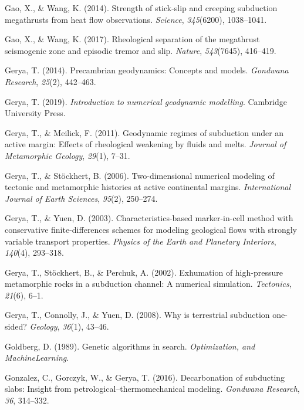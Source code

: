 \begin{CSLReferences}{1}{1}
\leavevmode{}%
Gao, X., \& Wang, K. (2014). Strength of stick-slip and creeping subduction megathrusts from heat flow observations. \emph{Science}, \emph{345}(6200), 1038--1041.

\leavevmode{}%
Gao, X., \& Wang, K. (2017). Rheological separation of the megathrust seismogenic zone and episodic tremor and slip. \emph{Nature}, \emph{543}(7645), 416--419.

\leavevmode{}%
Gerya, T. (2014). Precambrian geodynamics: Concepts and models. \emph{Gondwana Research}, \emph{25}(2), 442--463.

\leavevmode{}%
Gerya, T. (2019). \emph{Introduction to numerical geodynamic modelling}. Cambridge University Press.

\leavevmode{}%
Gerya, T., \& Meilick, F. (2011). Geodynamic regimes of subduction under an active margin: Effects of rheological weakening by fluids and melts. \emph{Journal of Metamorphic Geology}, \emph{29}(1), 7--31.

\leavevmode{}%
Gerya, T., \& Stöckhert, B. (2006). Two-dimensional numerical modeling of tectonic and metamorphic histories at active continental margins. \emph{International Journal of Earth Sciences}, \emph{95}(2), 250--274.

\leavevmode{}%
Gerya, T., \& Yuen, D. (2003). Characteristics-based marker-in-cell method with conservative finite-differences schemes for modeling geological flows with strongly variable transport properties. \emph{Physics of the Earth and Planetary Interiors}, \emph{140}(4), 293--318.

\leavevmode{}%
Gerya, T., Stöckhert, B., \& Perchuk, A. (2002). Exhumation of high-pressure metamorphic rocks in a subduction channel: A numerical simulation. \emph{Tectonics}, \emph{21}(6), 6--1.

\leavevmode{}%
Gerya, T., Connolly, J., \& Yuen, D. (2008). Why is terrestrial subduction one-sided? \emph{Geology}, \emph{36}(1), 43--46.

\leavevmode{}%
Goldberg, D. (1989). Genetic algorithms in search. \emph{Optimization, and MachineLearning}.

\leavevmode{}%
Gonzalez, C., Gorczyk, W., \& Gerya, T. (2016). Decarbonation of subducting slabs: Insight from petrological--thermomechanical modeling. \emph{Gondwana Research}, \emph{36}, 314--332.


\end{CSLReferences}
